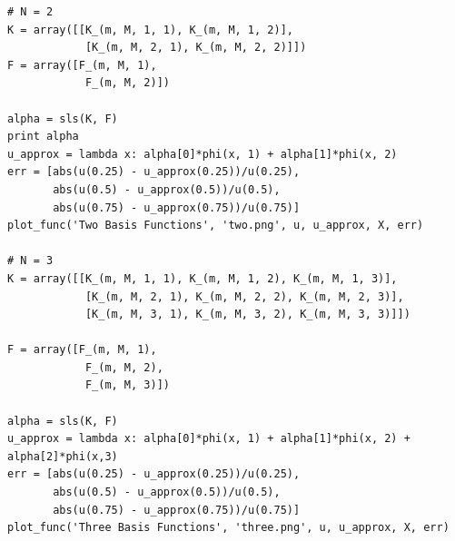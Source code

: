 \documentclass[10pt]{article}
\begin{document}
\begin{lstlisting}
# N = 2
K = array([[K_(m, M, 1, 1), K_(m, M, 1, 2)],
            [K_(m, M, 2, 1), K_(m, M, 2, 2)]])
F = array([F_(m, M, 1),
            F_(m, M, 2)])
            
alpha = sls(K, F)
print alpha
u_approx = lambda x: alpha[0]*phi(x, 1) + alpha[1]*phi(x, 2)
err = [abs(u(0.25) - u_approx(0.25))/u(0.25),
       abs(u(0.5) - u_approx(0.5))/u(0.5),
       abs(u(0.75) - u_approx(0.75))/u(0.75)]
plot_func('Two Basis Functions', 'two.png', u, u_approx, X, err)

# N = 3
K = array([[K_(m, M, 1, 1), K_(m, M, 1, 2), K_(m, M, 1, 3)],
            [K_(m, M, 2, 1), K_(m, M, 2, 2), K_(m, M, 2, 3)],
            [K_(m, M, 3, 1), K_(m, M, 3, 2), K_(m, M, 3, 3)]])

F = array([F_(m, M, 1),
            F_(m, M, 2),
            F_(m, M, 3)])
            
alpha = sls(K, F)
u_approx = lambda x: alpha[0]*phi(x, 1) + alpha[1]*phi(x, 2) + alpha[2]*phi(x,3)
err = [abs(u(0.25) - u_approx(0.25))/u(0.25),
       abs(u(0.5) - u_approx(0.5))/u(0.5),
       abs(u(0.75) - u_approx(0.75))/u(0.75)]
plot_func('Three Basis Functions', 'three.png', u, u_approx, X, err)
\end{lstlisting}
\end{document}
